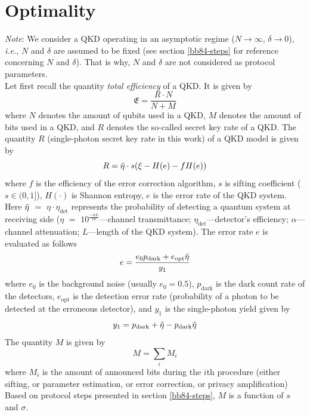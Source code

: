 \documentclass[journal,onecolumn]{IEEEtran}
\theoremstyle{thmstyleone}%
\theoremstyle{thmstyletwo}%
\theoremstyle{thmstylethree}%
\begin{document}
	\section{Optimality}\label{opt-def}
	\textit{Note}: We consider a QKD operating in an asymptotic regime ($N\rightarrow\infty$, $\delta\rightarrow0$), \textit{\textit{i.e.}}, $N$ and $\delta$ are assumed to be fixed (see section \ref{bb84-steps} for reference concerning $N$ and $\delta$). That is why, $N$ and $\delta$ are not considered as protocol parameters.\\
	\indent Let first recall the quantity \textit{total efficiency} of a QKD. It is given by \cite{Bebrov}
	\begin{equation}
		\mathfrak{E} = \frac{R\cdot N}{N + M}
	\end{equation}
	where $N$ denotes the amount of qubits used in a QKD, $M$ denotes the amount of bits used in a QKD, and $R$ denotes the so-called secret key rate of a QKD. The quantity $R$ (single-photon secret key rate in this work) of a QKD model is given by \cite{Gottesman}
	\begin{equation}\label{skr-exp}
		R = \Tilde{\eta}\cdot s(\xi - H(e)-fH(e))
	\end{equation}
	where $f$ is the efficiency of the error correction algorithm, $s$ is sifting coefficient ($s \in (0,1]$), $H(\cdot)$ is Shannon entropy, $e$ is the error rate of the QKD system. Here $\Tilde{\eta}$ $=$ $\eta\cdot\eta_{\text{det}}$ represents the probability of detecting a quantum system at receiving side ($\eta$ $=$ $10^{\frac{-\alpha L}{10}}$---channel transmittance; $\eta_{\text{det}}$---detector's efficiency; $\alpha$---channel attenuation; $L$---length of the QKD system). The error rate $e$ is evaluated as follows \cite{Ma}
	\begin{equation}
		e = \frac{e_0p_{\text{dark}}+e_{\text{opt}}\Tilde{\eta}}{y_1}
	\end{equation}
	where $e_0$ is the background noise (usually $e_0 = 0.5$), $p_{\text{dark}}$ is the dark count rate of the detectors, $e_{\text{opt}}$ is the detection error rate (probability of a photon to be detected at the erroneous detector), and $y_1$ is the single-photon yield given by \cite{Ma}
	\begin{equation}
		y_1 = p_{\text{dark}} + \Tilde{\eta} - p_{\text{dark}}\Tilde{\eta}
	\end{equation}
	\indent The quantity $M$ is given by \cite{Bebrov}
	\begin{equation}\label{cbits-exp}
		M = \sum\limits_i M_i
	\end{equation}
	where $M_i$ is the amount of announced bits during the $i$th procedure (either sifting, or parameter estimation, or error correction, or privacy amplification)
	Based on protocol steps presented in section \ref{bb84-steps}, $M$ is a function of $s$ and $\sigma$. 
	
\end{document}
